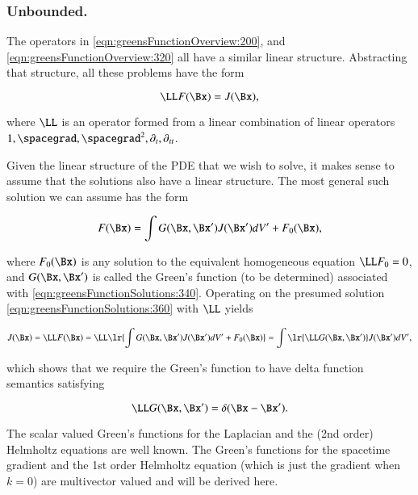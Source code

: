 %
%
\subsubsection{Unbounded.}

The operators in \cref{eqn:greensFunctionOverview:200}, and \cref{eqn:greensFunctionOverview:320} all have a similar linear structure.
Abstracting that structure, all these problems have the form

\begin{dmath}\label{eqn:greensFunctionSolutions:340}
\LL F(\Bx) = J(\Bx),
\end{dmath}

where \( \LL \) is an operator formed from a linear combination of linear operators \( 1, \spacegrad, \spacegrad^2, \partial_t, \partial_{tt} \).

Given the linear structure of the PDE that we wish to solve, it makes sense to assume that the solutions also have a linear structure.
The most general such solution we can assume has the form

\begin{dmath}\label{eqn:greensFunctionSolutions:360}
F(\Bx) = \int G(\Bx, \Bx') J(\Bx') dV' + F_0(\Bx),
\end{dmath}

where \( F_0(\Bx) \) is any solution to the equivalent homogeneous equation \( \LL F_0 = 0 \), and \( G(\Bx, \Bx') \) is called the Green's function (to be determined) associated with \cref{eqn:greensFunctionSolutions:340}.
Operating on the presumed solution
\cref{eqn:greensFunctionSolutions:360} with \( \LL \) yields

\begin{dmath}\label{eqn:greensFunctionSolutions:380}
J(\Bx) = \LL F(\Bx) = \LL\lr{
\int G(\Bx, \Bx') J(\Bx') dV' + F_0(\Bx) }
=
\int \lr{ \LL G(\Bx, \Bx') } J(\Bx') dV',
\end{dmath}

which shows that we require the Green's function to have delta function semantics satisfying

\begin{dmath}\label{eqn:greensFunctionSolutions:400}
\LL G(\Bx, \Bx') = \delta(\Bx - \Bx').
\end{dmath}

The scalar valued Green's functions for the Laplacian and the (2nd order) Helmholtz equations are well known.
The Green's functions for the spacetime gradient and the 1st order Helmholtz equation (which is just the gradient when \( k = 0 \)) are multivector valued and will be derived here.

